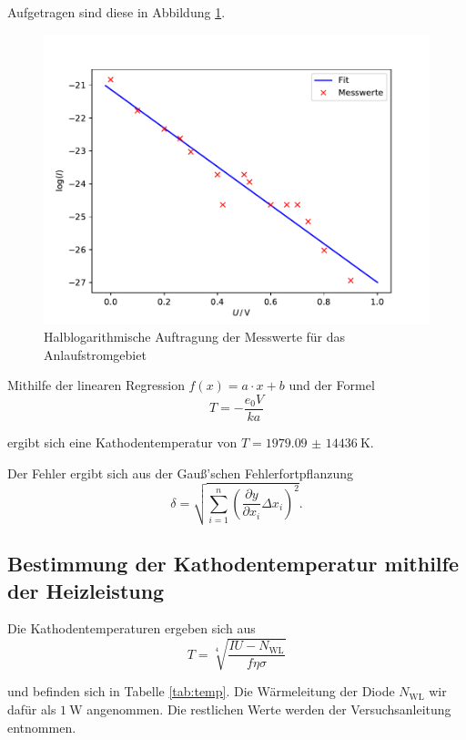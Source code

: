 \newpage
Aufgetragen sind diese in Abbildung \ref{fig:anlauf}.
\begin{figure}[H]
  \centering
  \includegraphics[width=\textwidth]{Plots/anlauf.pdf}
  \caption{Halblogarithmische Auftragung der Messwerte für das Anlaufstromgebiet}
  \label{fig:anlauf}
\end{figure}

Mithilfe der linearen Regression $f(x) = a \cdot x + b$ und der Formel
\begin{equation}
  T = - \frac{e_0 V}{k a}
\end{equation}

ergibt sich eine Kathodentemperatur von $T = \SI{1979,09(14436)}{\K}$.

Der Fehler ergibt sich aus der Gauß'schen Fehlerfortpflanzung
\begin{equation}
  \delta = \sqrt{ \sum_{i=1}^{n}(\frac{\partial y}{\partial x_i} \Delta x_i)^2}.
\end{equation}

\subsection{Bestimmung der Kathodentemperatur mithilfe der Heizleistung}

Die Kathodentemperaturen ergeben sich aus
\begin{equation}
  T = \sqrt[4]{\frac{I U - N_\text{WL}}{f \eta \sigma}}
\end{equation}

und befinden sich in Tabelle \ref{tab:temp}.
Die Wärmeleitung der Diode $N_\text{WL}$ wir dafür als $\SI{1}{\W}$ angenommen. Die restlichen Werte werden der Versuchsanleitung entnommen.


